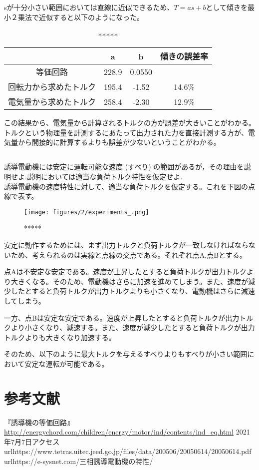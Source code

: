 \documentclass{ltjsarticle}
\begin{document}
sが十分小さい範囲においては直線に近似できるため、$T = as + b$として傾きを最小２乗法で近似すると以下のようになった。

\begin{table}[H]
    \begin{center}
        \begin{tabular}{|c|c|c|c|} \hline            
            & a & b & 傾きの誤差率\\ \hline
            等価回路 & 228.9 & 0.0550 &  \\ \hline
            回転力から求めたトルク & 195.4 & -1.52 & 14.6\% \\ \hline
            電気量から求めたトルク & 258.4 & -2.30 & 12.9\% \\ \hline
        \end{tabular}
        \caption{*****}
    \end{center}
\end{table}

この結果から、電気量から計算されるトルクの方が誤差が大きいことがわかる。トルクという物理量を計測するにあたって出力された力を直接計測する方が、電気量から間接的に計算するよりも誤差が少ないということがわかる。

\subsection{}
誘導電動機には安定に運転可能な速度 (すべり) の範囲があるが，その理由を説明せよ.説明においては適当な負荷トルク特性を仮定せよ.\\

誘導電動機の速度特性に対して、適当な負荷トルクを仮定する。これを下図の点線で表す。

\begin{figure}[H]
    \begin{center}
        \texttt{[image: figures/2/experiments\_.png]}
        \caption{*****}
    \end{center}
\end{figure}

安定に動作するためには、まず出力トルクと負荷トルクが一致しなければならないため、考えられるのは実線と点線の交点である。それぞれ点A,点Bとする。

点Aは不安定な安定である。速度が上昇したとすると負荷トルクが出力トルクより大きくなる。そのため、電動機はさらに加速を進めてしまう。また、速度が減少したとすると負荷トルクが出力トルクよりも小さくなり、電動機はさらに減速してしまう。

一方、点Bは安定な安定である。速度が上昇したとすると負荷トルクが出力トルクより小さくなり、減速する。また、速度が減少したとすると負荷トルクが出力トルクよりも大きくなり加速する。

そのため、以下のように最大トルクを与えるすべりよりもすべりが小さい範囲において安定な運転が可能である。



\section{参考文献}
『誘導機の等価回路』\url{http://energychord.com/children/energy/motor/ind/contents/ind_eq.html} 2021年7月7日アクセス\\
url{https://www.tetras.uitec.jeed.go.jp/files/data/200506/20050614/20050614.pdf}\\
url{https://e-sysnet.com/三相誘導電動機の特性/}
\end{document}
